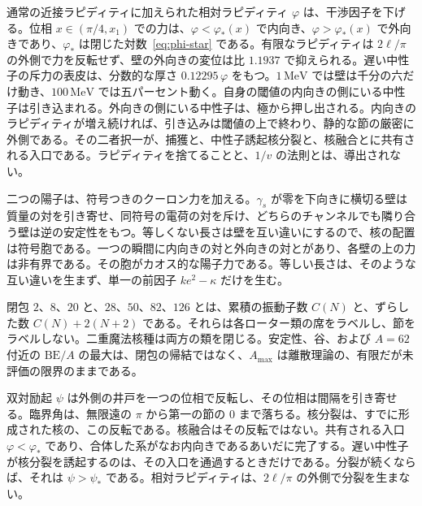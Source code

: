 \documentclass[a4paper]{article}
\begin{document}
通常の近接ラピディティに加えられた相対ラピディティ \(\varphi\) は、干渉因子を下げる。位相 \(x\in(\pi/4,x_1)\) での力は、\(\varphi<\varphi_*(x)\) で内向き、\(\varphi>\varphi_*(x)\) で外向きであり、\(\varphi_*\) は閉じた対数~\eqref{eq:phi-star} である。有限なラピディティは \(2\ell/\pi\) の外側で力を反転せず、壁の外向きの変位は比 \(1.1937\) で抑えられる。遅い中性子の斥力の表皮は、分数的な厚さ \(0.12295\,\varphi\) をもつ。\(1\,\mathrm{MeV}\) では壁は千分の六だけ動き、\(100\,\mathrm{MeV}\) では五パーセント動く。自身の閾値の内向きの側にいる中性子は引き込まれる。外向きの側にいる中性子は、極から押し出される。内向きのラピディティが増え続ければ、引き込みは閾値の上で終わり、静的な節の厳密に外側である。その二者択一が、捕獲と、中性子誘起核分裂と、核融合とに共有される入口である。ラピディティを捨てることと、\(1/v\) の法則とは、導出されない。

二つの陽子は、符号つきのクーロン力を加える。\(\gamma_s\) が零を下向きに横切る壁は質量の対を引き寄せ、同符号の電荷の対を斥け、どちらのチャンネルでも隣り合う壁は逆の安定性をもつ。等しくない長さは壁を互い違いにするので、核の配置は符号胞である。一つの瞬間に内向きの対と外向きの対とがあり、各壁の上の力は非有界である。その胞がカオス的な陽子力である。等しい長さは、そのような互い違いを生まず、単一の前因子 \(k e^{2}-\kappa\) だけを生む。

閉包 \(2\)、\(8\)、\(20\) と、\(28\)、\(50\)、\(82\)、\(126\) とは、累積の振動子数 \(C(N)\) と、ずらした数 \(C(N)+2(N+2)\) である。それらは各ローター類の席をラベルし、節をラベルしない。二重魔法核種は両方の類を閉じる。安定性、谷、および \(A=62\) 付近の \(\mathrm{BE}/A\) の最大は、閉包の帰結ではなく、\(A_{\max}\) は離散理論の、有限だが未評価の限界のままである。

双対励起 \(\psi\) は外側の井戸を一つの位相で反転し、その位相は間隔を引き寄せる。臨界角は、無限遠の \(\pi\) から第一の節の \(0\) まで落ちる。核分裂は、すでに形成された核の、この反転である。核融合はその反転ではない。共有される入口 \(\varphi<\varphi_*\) であり、合体した系がなお内向きであるあいだに完了する。遅い中性子が核分裂を誘起するのは、その入口を通過するときだけである。分裂が続くならば、それは \(\psi>\psi_*\) である。相対ラピディティは、\(2\ell/\pi\) の外側で分裂を生まない。
\end{document}
